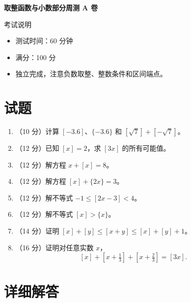 \documentclass[11pt,a4paper,fontset=fandol]{ctexart}
\begin{document}
\thispagestyle{empty}
\begin{center}{\fontsize{22}{28}\selectfont\bfseries 取整函数与小数部分周测 A 卷\par}\vspace{0.35cm}{\large 初中数学联赛专题基础检测\par}\end{center}
\begin{infobox}{考试说明}
\begin{itemize}\item 测试时间：60 分钟\item 满分：100 分\item 独立完成，注意负数取整、整数条件和区间端点。\end{itemize}
\end{infobox}
\section{试题}
\begin{enumerate}
\item（10 分）计算 $[-3.6]$、$\{-3.6\}$ 和 $[\sqrt7]+[-\sqrt7]$。\answerspace
\item（12 分）已知 $[x]=2$，求 $[3x]$ 的所有可能值。\answerspace
\item（12 分）解方程 $x+[x]=8$。\answerspace
\item（12 分）解方程 $[x]+\{2x\}=3$。\answerspace
\item（12 分）解不等式 $-1\le[2x-3]<4$。\answerspace
\item（12 分）解不等式 $[x]>\{x\}$。\answerspace
\item（14 分）证明 $[x]+[y]\le[x+y]\le[x]+[y]+1$。\biganswerspace
\item（16 分）证明对任意实数 $x$，
\[
[x]+[x+\tfrac13]+[x+\tfrac23]=[3x].
\]\biganswerspace
\end{enumerate}
\newpage\section{详细解答}
\end{document}
